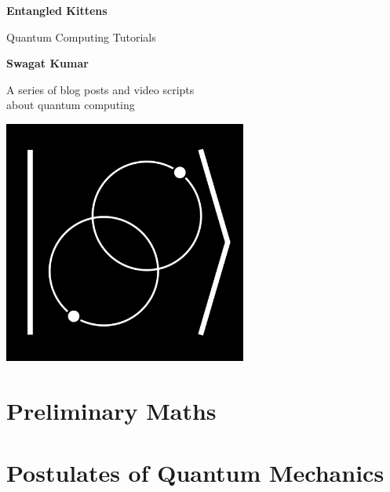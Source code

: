 \documentclass[12pt,openany,oneside]{book}
\begin{document}
    { \let\cleardoublepage\clearpage
    \begin{titlepage}
        \begin{center}
            \vspace*{1.5cm}

            \Huge
            \textbf{Entangled Kittens}

            \vspace{0.5cm}
            \LARGE
            Quantum Computing Tutorials

            \vspace{1.5cm}

            \textbf{Swagat Kumar}

            \vspace{0.4cm}

            A series of blog posts and video scripts\\
            about quantum computing
            \vspace{1.6cm}

            \includegraphics[width=0.6\textwidth]{logo.png}
            
            \thispagestyle{empty}
        \end{center}
    \end{titlepage}
    \frontmatter
    \tableofcontents
    }
    \mainmatter

    \part{Preliminary Maths}
    
    
    
    \part{Postulates of Quantum Mechanics}
    
    
    
    
\end{document}
